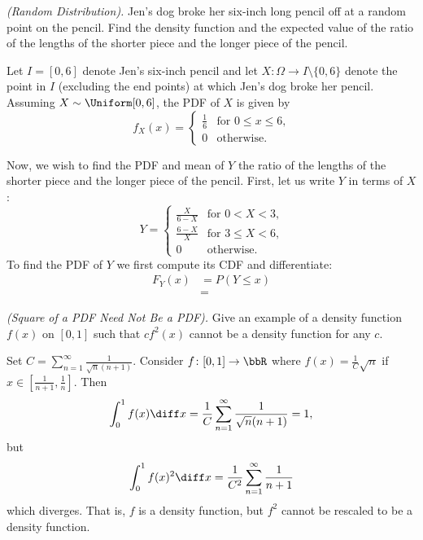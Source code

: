 \begin{problem}[Handout 12, \# 19]
  \emph{(Random Distribution).} Jen's dog broke her six-inch long pencil
  off at a random point on the pencil. Find the density function and the
  expected value of the ratio of the lengths of the shorter piece and the
  longer piece of the pencil.
\end{problem}
\begin{solution}
  Let \(I=[0,6]\) denote Jen's six-inch pencil and let
  \(X\colon\Omega\to I\setminus\{0,6\}\) denote the point in \(I\)
  (excluding the end points) at which Jen's dog broke her pencil. Assuming
  \(X\sim\Uniform[0,6]\), the PDF of \(X\) is given by
  \[
    f_X(x)=
    \begin{cases}
      \frac{1}{6}&\text{for \(0\leq x\leq 6\),}\\
      0&\text{otherwise.}
    \end{cases}
  \]

  Now, we wish to find the PDF and mean of \(Y\) the ratio of the lengths
  of the shorter piece and the longer piece of the pencil. First, let us
  write \(Y\) in terms of \(X\):
  \[
    Y=
    \begin{cases}
      \frac{X}{6-X}&\text{for \(0<X<3\),}\\
      \frac{6-X}{X}&\text{for \(3\leq X<6\),}\\
      0&\text{otherwise.}
    \end{cases}
  \]
  To find the PDF of \(Y\) we first compute its CDF and differentiate:
  \begin{align*}
    F_Y(x)
    &=P(Y\leq x)\\
    &=
  \end{align*}
\end{solution}
\newpage

\begin{problem}[Handout 12, \# 20]
  \emph{(Square of a PDF Need Not Be a PDF).} Give an example of a density
  function \(f(x)\) on \([0,1]\) such that \(cf^2(x)\) cannot be a density
  function for any \(c\).
\end{problem}
\begin{solution}
  Set $C = \sum_{n=1}^\infty \frac{1}{\sqrt{n}(n+1)}$. Consider
  $f\colon [0,1] \to \bbR$ where $f(x) = \frac{1}{C} \sqrt{n}$ if
  $x \in [\frac{1}{n+1},\frac{1}{n}]$. Then
  \[
    \int_0^1 f(x) \diff x = \frac{1}{C} \sum_{n=1}^\infty
    \frac{1}{\sqrt{n}(n+1)} =1,
  \]
  but
  \[
    \int_0^1 f(x)^2 \diff x = \frac{1}{C^2} \sum_{n=1}^\infty \frac{1}{n+1}
  \]
  which diverges. That is, $f$ is a density function, but $f^2$ cannot be
  rescaled to be a density function.
\end{solution}
\newpage

